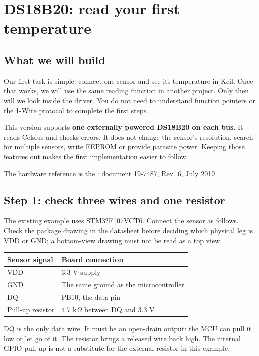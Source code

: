 \section{DS18B20: read your first temperature}
\subsection{What we will build}
Our first task is simple: connect one sensor and see its temperature in Keil. Once that works, we will use the same reading function in another project. Only then will we look inside the driver. You do not need to understand function pointers or the 1-Wire protocol to complete the first steps.

This version supports \textbf{one externally powered DS18B20 on each bus}. It reads Celsius and checks errors. It does not change the sensor's resolution, search for multiple sensors, write EEPROM or provide parasite power. Keeping those features out makes the first implementation easier to follow.


The hardware reference is the : document 19-7487, Rev. 6, July 2019 \cite{ds18b20}.

\subsection{Step 1: check three wires and one resistor}
The existing example uses STM32F107VCT6. Connect the sensor as follows. Check the package drawing in the datasheet before deciding which physical leg is VDD or GND; a bottom-view drawing must not be read as a top view.
\begin{center}
\begin{tabular}{p{38mm}p{91mm}}
\toprule
Sensor signal & Board connection\\
\midrule
VDD & 3.3 V supply\\
GND & The same ground as the microcontroller\\
DQ & PB10, the data pin\\
Pull-up resistor & 4.7 k$\Omega$ between DQ and 3.3 V\\
\bottomrule
\end{tabular}
\end{center}
DQ is the only data wire. It must be an open-drain output: the MCU can pull it low or let go of it. The resistor brings a released wire back high. The internal GPIO pull-up is not a substitute for the external resistor in this example.

